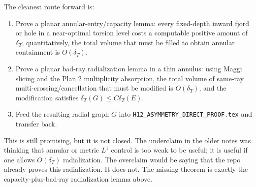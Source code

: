 \documentclass[11pt]{article}
\newcommand{\dT}{\delta_T}
\begin{document}
The cleanest route forward is:

\begin{enumerate}
\item Prove a planar annular-entry/capacity lemma: every fixed-depth
inward fjord or hole in a near-optimal torsion level costs a computable
positive amount of \(\dT\); quantitatively, the total volume that must
be filled to obtain annular containment is \(O(\dT)\).

\item Prove a planar bad-ray radialization lemma in a thin annulus:
using Maggi slicing and the Plan 2 multiplicity absorption, the total
volume of same-ray multi-crossing/cancellation that must be modified is
\(O(\dT)\), and the modification satisfies \(\dT(G)\le C\dT(E)\).

\item Feed the resulting radial graph \(G\) into
\texttt{H12\_ASYMMETRY\_DIRECT\_PROOF.tex} and transfer back.
\end{enumerate}

This is still promising, but it is not closed.  The underclaim in the
older notes was thinking that annular or metric \(L^1\) control is too
weak to be useful; it is useful if one allows \(O(\dT)\) radialization.
The overclaim would be saying that the repo already proves this
radialization.  It does not.  The missing theorem is exactly the
capacity-plus-bad-ray radialization lemma above.
\end{document}
